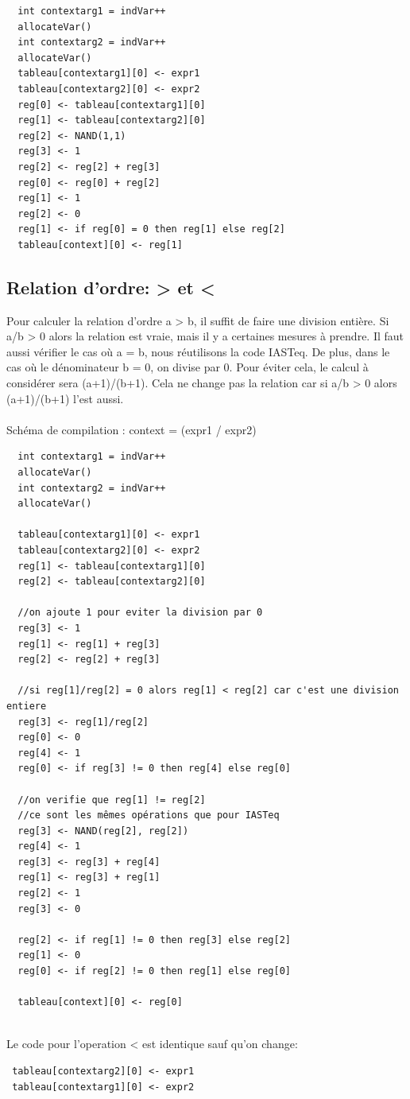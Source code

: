\documentclass[a4paper,12pt]{report}
\begin{document}
\begin{verbatim}
  int contextarg1 = indVar++
  allocateVar()
  int contextarg2 = indVar++
  allocateVar()
  tableau[contextarg1][0] <- expr1
  tableau[contextarg2][0] <- expr2
  reg[0] <- tableau[contextarg1][0]
  reg[1] <- tableau[contextarg2][0]
  reg[2] <- NAND(1,1)
  reg[3] <- 1
  reg[2] <- reg[2] + reg[3]
  reg[0] <- reg[0] + reg[2]
  reg[1] <- 1
  reg[2] <- 0
  reg[1] <- if reg[0] = 0 then reg[1] else reg[2]
  tableau[context][0] <- reg[1]
\end{verbatim}

\subsection{Relation d'ordre: > et <}
Pour calculer la relation d'ordre a > b, il suffit de faire une division entière.
Si a/b > 0 alors la relation est vraie, mais il y a certaines mesures à prendre.
Il faut aussi vérifier le cas où a = b, nous réutilisons la code IASTeq. De plus, dans le cas où le dénominateur b = 0, on divise
par 0. Pour éviter cela, le calcul à considérer sera (a+1)/(b+1). Cela ne change pas la relation car si a/b > 0 alors (a+1)/(b+1) l'est aussi.
\\ \\
Schéma de compilation : context = (expr1 / expr2)
\begin{verbatim}
  int contextarg1 = indVar++
  allocateVar()
  int contextarg2 = indVar++
  allocateVar()
  
  tableau[contextarg1][0] <- expr1
  tableau[contextarg2][0] <- expr2
  reg[1] <- tableau[contextarg1][0]
  reg[2] <- tableau[contextarg2][0]
    
  //on ajoute 1 pour eviter la division par 0
  reg[3] <- 1
  reg[1] <- reg[1] + reg[3]
  reg[2] <- reg[2] + reg[3]
    
  //si reg[1]/reg[2] = 0 alors reg[1] < reg[2] car c'est une division entiere
  reg[3] <- reg[1]/reg[2]
  reg[0] <- 0
  reg[4] <- 1
  reg[0] <- if reg[3] != 0 then reg[4] else reg[0]
    
  //on verifie que reg[1] != reg[2]
  //ce sont les mêmes opérations que pour IASTeq
  reg[3] <- NAND(reg[2], reg[2])
  reg[4] <- 1
  reg[3] <- reg[3] + reg[4]
  reg[1] <- reg[3] + reg[1]
  reg[2] <- 1
  reg[3] <- 0
  
  reg[2] <- if reg[1] != 0 then reg[3] else reg[2]
  reg[1] <- 0
  reg[0] <- if reg[2] != 0 then reg[1] else reg[0]
    
  tableau[context][0] <- reg[0]
		
\end{verbatim}
Le code pour l'operation < est identique sauf qu'on change:
\begin{verbatim}
 tableau[contextarg2][0] <- expr1
 tableau[contextarg1][0] <- expr2
\end{verbatim}
\end{document}
